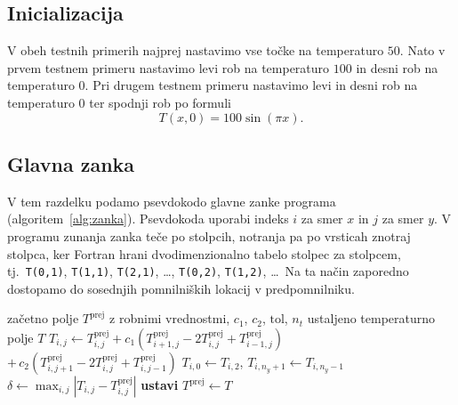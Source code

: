 \documentclass[a4paper,11pt]{article}
\begin{document}
	\subsection{Inicializacija}
	
	V obeh testnih primerih najprej nastavimo vse točke na temperaturo $50$. Nato v prvem testnem primeru nastavimo levi rob na temperaturo $100$ in desni rob na temperaturo $0$. Pri drugem testnem primeru nastavimo levi in desni rob na temperaturo $0$ ter spodnji rob po formuli
	\begin{equation}
		T(x, 0) = 100 \sin(\pi x).
	\end{equation}
	
	\subsection{Glavna zanka}
	
	V tem razdelku podamo psevdokodo glavne zanke programa (algoritem~\ref{alg:zanka}). Psevdokoda uporabi indeks $i$ za smer $x$ in $j$ za smer $y$. V programu zunanja zanka teče po stolpcih, notranja pa po vrsticah znotraj stolpca, ker Fortran hrani dvodimenzionalno tabelo stolpec za stolpcem, tj.\ \texttt{T(0,1)}, \texttt{T(1,1)}, \texttt{T(2,1)}, \dots, \texttt{T(0,2)}, \texttt{T(1,2)}, \dots\ Na ta način zaporedno dostopamo do sosednjih pomnilniških lokacij v predpomnilniku.
	
	\begin{algorithm}[htbp]
		\caption{Glavna zanka eksplicitne sheme (testni primer~1).}
		\label{alg:zanka}
		\begin{algorithmic}[1]
			\Require začetno polje $T^{\text{prej}}$ z robnimi vrednostmi, $c_1$, $c_2$, $\text{tol}$, $n_t$
			\Ensure ustaljeno temperaturno polje $T$
			 
			 
			\State $T_{i,j} \gets T^{\text{prej}}_{i,j} + c_1\left(T^{\text{prej}}_{i+1,j} - 2T^{\text{prej}}_{i,j} + T^{\text{prej}}_{i-1,j}\right)$
			\Statex \hspace{\algorithmicindent}\hspace{\algorithmicindent}\hspace{\algorithmicindent}\hspace{\algorithmicindent}\hspace{1.2cm}$+\, c_2\left(T^{\text{prej}}_{i,j+1} - 2T^{\text{prej}}_{i,j} + T^{\text{prej}}_{i,j-1}\right)$
			\EndFor
			\EndFor
			\State $T_{i,0} \gets T_{i,2}$, \quad $T_{i,n_y+1} \gets T_{i,n_y-1}$ 
			\State $\delta \gets \max_{i,j} \left| T_{i,j} - T^{\text{prej}}_{i,j} \right|$
			\State \textbf{ustavi} 
			\EndIf
			\State $T^{\text{prej}} \gets T$
			\EndFor
		\end{algorithmic}
	\end{algorithm}
	
\end{document}
